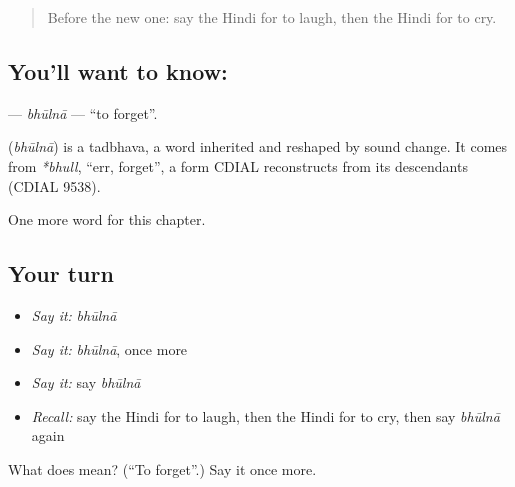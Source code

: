 \label{lesson:HI-C162-bhulna}



\begin{quote}
Before the new one: say the Hindi for to laugh, then the Hindi for to cry.
\end{quote}

\subsection*{You'll want to know: }
\textbf{} — \emph{bhūlnā} — \textquotedblleft{}to forget\textquotedblright{}.

\begin{cousinweb}
\textbf{} (\emph{bhūlnā}) is a tadbhava, a word inherited and reshaped by sound change. It comes from \emph{*bhull}, \textquotedblleft{}err, forget\textquotedblright{}, a form CDIAL reconstructs from its descendants (CDIAL 9538).
\end{cousinweb}

\begin{grammarlens}[title={What you've built}]
One more word for this chapter.
\end{grammarlens}

\subsection*{Your turn}
\begin{itemize}
\raggedright
  \item \emph{Say it:} \emph{bhūlnā}
  \item \emph{Say it:} \emph{bhūlnā}, once more
  \item \emph{Say it:} say \emph{bhūlnā}
  \item \emph{Recall:} say the Hindi for to laugh, then the Hindi for to cry, then say \emph{bhūlnā} again
\end{itemize}

\begin{tcolorbox}[breakable,colback=teal!4,colframe=teal!35!black,title={Before you move on}]
What does  mean? (\textquotedblleft{}To forget\textquotedblright{}.) Say it once more.
\end{tcolorbox}
